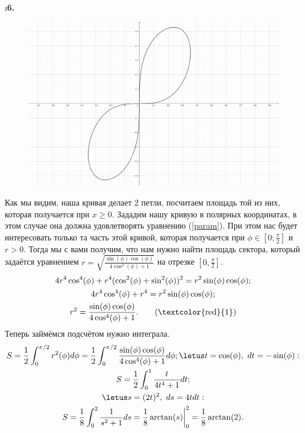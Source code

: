 \i\textbf{6.}

\begin{figure}
    \includegraphics[scale=6]{course1/calculus/homeworks/some data/05.23.png}
\end{figure}
Как мы видим, наша кривая делает 2 петли, посчитаем площадь той из них, которая получается при $x \geq 0$. Зададим нашу кривую в полярных координатах, в этом случае она должна удовлетворять уравнению (\textcolor{red}{\ref{param}}). При этом нас будет интересовать только та часть этой кривой, которая получается при $\phi \in [0; \frac{\pi}{2}]$ и $r > 0$. Тогда мы с вами получим, что нам нужно найти площадь сектора, который задаётся уравнением $r = \sqrt{\frac{\sin(\phi)\cos(\phi)}{4\cos^3(\phi) + 1}}$ на отрезке $[0, \frac{\pi}{2}]$.
\begin{gather*}
    4r^4\cos^4(\phi) + r^4(\cos^2(\phi) + \sin^2(\phi))^2 = r^2\sin(\phi)\cos(\phi);\\
    4r^4\cos^4(\phi) + r^4 = r^2\sin(\phi)\cos(\phi);\\
    r^2 = \frac{\sin(\phi)\cos(\phi)}{4\cos^4(\phi) + 1}. \tag{\textcolor{red}{1}} \label{param}
\end{gather*}
Теперь займёмся подсчётом нужно интеграла.
\begin{gather*}
    S = \frac{1}{2}\int_0^{\pi/2} r^2(\phi)d\phi = \frac{1}{2}\int_0^{\pi/2} \frac{\sin(\phi)\cos(\phi)}{4\cos^4(\phi) + 1}d\phi;
    \letus t = \cos(\phi),\ dt = -\sin(\phi):\\
    S = \frac{1}{2}\int_0^1 \frac{t}{4t^4 + 1}dt;\\
    \letus s = (2t)^2,\ ds = 4tdt:\\
    S = \frac{1}{8}\int_0^2 \frac{1}{s^2+1}ds = \frac{1}{8}\arctan(s)\bigg|_0^2 = \frac{1}{8}\arctan(2).
\end{gather*}


